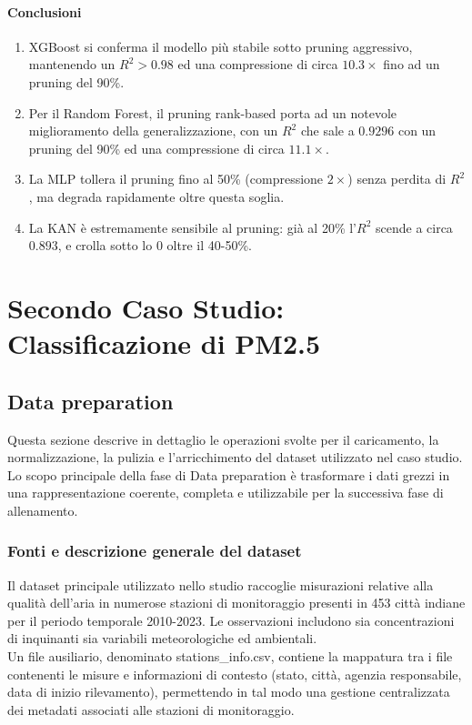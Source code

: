 \documentclass[a4paper,12pt]{report}
\begin{document}
	\subsubsection{Conclusioni}
	\begin{enumerate}
		\item XGBoost si conferma il modello più stabile sotto pruning aggressivo, mantenendo un \(R^2 > 0.98\) ed una compressione di circa $10.3\times$ fino ad un pruning del 90\%.
		\item Per il Random Forest, il pruning rank-based porta ad un notevole miglioramento della generalizzazione, con un \(R^2\) che sale a $0.9296$ con un pruning del 90\% ed una compressione di circa $11.1\times$.
		\item La MLP tollera il pruning fino al 50\% (compressione $2\times$) senza perdita di $R^2$, ma degrada rapidamente oltre questa soglia.
		\item La KAN è estremamente sensibile al pruning: già al 20\% l'$R^2$ scende a circa $0.893$, e crolla sotto lo 0 oltre il 40-50\%.
	\end{enumerate}
	
	\chapter{Secondo Caso Studio: Classificazione di PM2.5}
	
	\section{Data preparation}
	
	Questa sezione descrive in dettaglio le operazioni svolte per il caricamento, la normalizzazione, la pulizia e l'arricchimento del dataset utilizzato nel caso studio. Lo scopo principale della fase di Data preparation è trasformare i dati grezzi in una rappresentazione coerente, completa e utilizzabile per la successiva fase di allenamento.
	
	\subsection{Fonti e descrizione generale del dataset}
	Il dataset principale utilizzato nello studio raccoglie misurazioni relative alla qualità dell'aria in numerose stazioni di monitoraggio presenti in 453 città indiane per il periodo temporale 2010-2023. Le osservazioni includono sia concentrazioni di inquinanti sia variabili meteorologiche ed ambientali.\\
	Un file ausiliario, denominato stations\_info.csv, contiene la mappatura tra i file contenenti le misure e informazioni di contesto (stato, città, agenzia responsabile, data di inizio rilevamento), permettendo in tal modo una gestione centralizzata dei metadati associati alle stazioni di monitoraggio.
	
\end{document}
